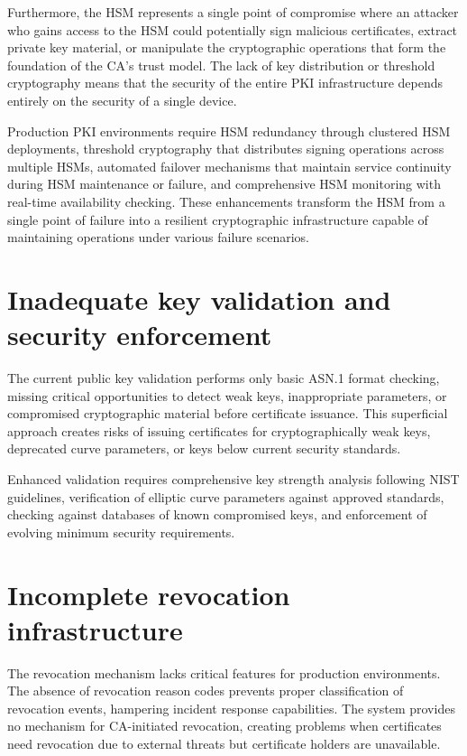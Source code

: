 Furthermore, the HSM represents a single point of compromise where an attacker who gains access to the HSM could potentially sign malicious certificates, extract private key material, or manipulate the cryptographic operations that form the foundation of the CA's trust model. The lack of key distribution or threshold cryptography means that the security of the entire PKI infrastructure depends entirely on the security of a single device.

Production PKI environments require HSM redundancy through clustered HSM deployments, threshold cryptography that distributes signing operations across multiple HSMs, automated failover mechanisms that maintain service continuity during HSM maintenance or failure, and comprehensive HSM monitoring with real-time availability checking. These enhancements transform the HSM from a single point of failure into a resilient cryptographic infrastructure capable of maintaining operations under various failure scenarios.


\section{Inadequate key validation and security enforcement}

The current public key validation performs only basic ASN.1 format checking, missing critical opportunities to detect weak keys, inappropriate parameters, or compromised cryptographic material before certificate issuance. This superficial approach creates risks of issuing certificates for cryptographically weak keys, deprecated curve parameters, or keys below current security standards.

Enhanced validation requires comprehensive key strength analysis following NIST guidelines, verification of elliptic curve parameters against approved standards, checking against databases of known compromised keys, and enforcement of evolving minimum security requirements.

\section{Incomplete revocation infrastructure}

The revocation mechanism lacks critical features for production environments. The absence of revocation reason codes prevents proper classification of revocation events, hampering incident response capabilities. The system provides no mechanism for CA-initiated revocation, creating problems when certificates need revocation due to external threats but certificate holders are unavailable.

